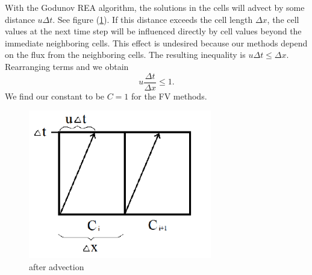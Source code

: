 With the Godunov REA algorithm, the solutions in the cells will advect by some distance $u \Delta t$. See figure (\ref{CFLfig}). If this distance exceeds the cell length $\Delta x$, the cell values at the next time step will be influenced directly by cell values beyond the immediate neighboring cells. This effect is undesired because our methods depend on the flux from the neighboring cells. The resulting inequality is $u \Delta t \le \Delta x$. Rearranging terms and we obtain
%
\begin{equation*}
u \frac{\Delta t}{\Delta x} \le 1.
\end{equation*}
%
We find our constant to be $C = 1$ for the FV methods.
%
\begin{figure}[ht!]
  \centering
      \includegraphics[angle=0,width=80mm]{CFL/cfl.pdf}
  \caption{after advection}
\label{CFLfig}
\end{figure}
\FloatBarrier
%
